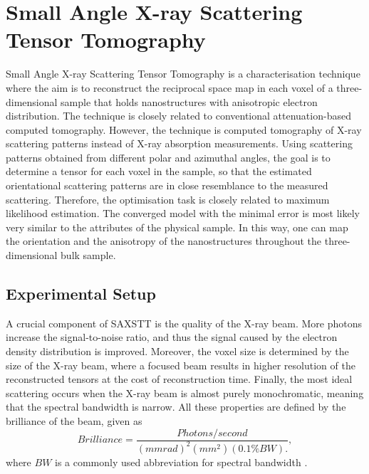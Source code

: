 \chapter{Small Angle X-ray Scattering Tensor Tomography}
\label{chap:SAXSTT}

Small Angle X-ray Scattering Tensor Tomography is a characterisation technique where the aim is to reconstruct the reciprocal space map in each voxel of a three-dimensional sample
that holds nanostructures with anisotropic electron distribution. The technique is closely related to conventional attenuation-based computed tomography.
However, the technique is computed tomography of X-ray scattering patterns instead of X-ray absorption measurements.
Using scattering patterns obtained from different polar and azimuthal angles, the goal is to determine a tensor for each voxel in the sample,
so that the estimated orientational scattering patterns are in close resemblance to the measured scattering.
Therefore, the optimisation task is closely related to maximum likelihood estimation. The converged model with the minimal error is most likely very similar to the attributes of the physical sample.
In this way, one can map the orientation and the anisotropy of the nanostructures throughout the three-dimensional bulk sample.

\section{Experimental Setup}
A crucial component of SAXSTT is the quality of the X-ray beam.
More photons increase the signal-to-noise ratio, and thus the signal caused by the electron density distribution is improved.
Moreover, the voxel size is determined by the size of the X-ray beam, where a focused beam results in higher resolution of the reconstructed tensors at the cost of reconstruction time.
Finally, the most ideal scattering occurs when the X-ray beam is almost purely monochromatic, meaning that the spectral bandwidth is narrow.
All these properties are defined by the brilliance of the beam, given as
\begin{equation}\label{eq:brilliance}
    Brilliance = \frac{Photons/second}{\left( mmrad \right)^{2} \left( mm^{2} \right) \left( 0.1\% BW \right).},
\end{equation}
where $BW$ is a commonly used abbreviation for spectral bandwidth \cite{mcmorrow2011elements}.


